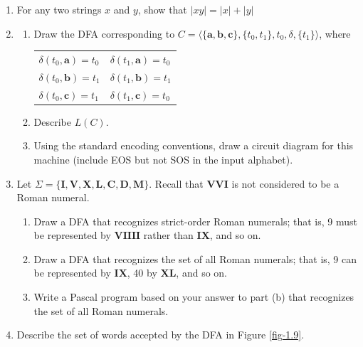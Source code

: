 \begin{enumerate}[{1.}1.]
\item For any two strings $x$ and $y$, show that $|xy| = |x| + |y|$

\item \begin{enumerate}
\item Draw the DFA corresponding to
$C=\langle\{\pmb{a},\pmb{b},\pmb{c}\},\{t_0,t_1\},t_0,\delta,\{t_1\}\rangle$,
where
\begin{center}\begin{tabular}{l@{$\qquad$}l}
$\delta(t_0,\pmb{a})=t_0$ & $\delta(t_1,\pmb{a})=t_0$ \\
$\delta(t_0,\pmb{b})=t_1$ & $\delta(t_1,\pmb{b})=t_1$ \\
$\delta(t_0,\pmb{c})=t_1$ & $\delta(t_1,\pmb{c})=t_0$
\end{tabular}\end{center}
\item Describe $L(C)$.
\item Using the standard encoding conventions, draw a circuit diagram for this
machine (include \<EOS\> but not \<SOS\> in the input alphabet).
\end{enumerate}

\item Let $\Sigma=\{\pmb{I},\pmb{V},\pmb{X},\pmb{L},\pmb{C},\pmb{D},\pmb{M}\}$.
Recall that $\pmb{VVI}$ is not considered to be a Roman numeral.
\begin{enumerate}
\item Draw a DFA that recognizes strict-order Roman numerals; that is, 9 must be
represented by $\pmb{VIIII}$ rather than $\pmb{IX}$, and so on.
\item Draw a DFA that recognizes the set of all Roman numerals; that is, 9 can
be represented by $\pmb{IX}$, 40 by $\pmb{XL}$, and so on.
\item Write a Pascal program based on your answer to part (b) that recognizes
the set of all Roman numerals.
\end{enumerate}

\item Describe the set of words accepted by the DFA in Figure \ref{fig-1.9}.


\end{enumerate}
